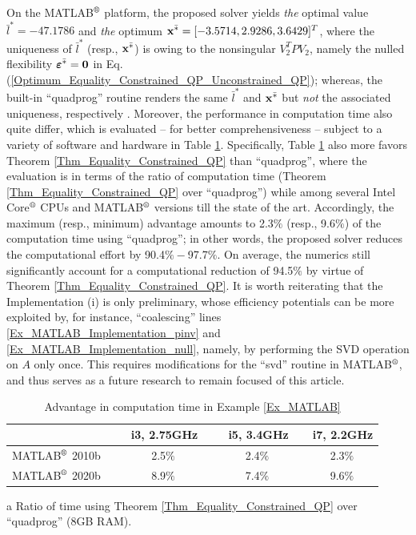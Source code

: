 \documentclass{imaman}
\newcommand{\bfx}{{\bf x}}
\newcommand{\bfvarepsilon}{{\boldsymbol \varepsilon}}
\newcommand{\bfzero}{{\bf 0}}
\numberwithin{equation}{section}
\begin{document}
\begin{example}
On the MATLAB$\textsuperscript{\textregistered}$ platform, the proposed solver yields \textit{the} optimal value $\bar l^*=-47.1786$ and \textit{the} optimum $\bfx^{\bar *}=[-3.5714,2.9286,3.6429]^T$, where the uniqueness of $\bar l^*$ (resp., $\bfx^{\bar *}$) is owing to the nonsingular $V_2^TPV_2$, namely the nulled flexibility $\bfvarepsilon^{\bar *}=\bfzero$ in Eq. (\ref{Optimum_Equality_Constrained_QP_Unconstrained_QP}); whereas, the built-in ``quadprog'' routine renders the same $\bar l^*$ and $\bfx^{\bar *}$ but \textit{not} the associated uniqueness, respectively \cite{MATLAB}. Moreover, the performance in computation time also quite differ, which is evaluated -- for better comprehensiveness -- subject to a variety of software and hardware in Table \ref{Table_Ex_MATLAB}. Specifically, Table \ref{Table_Ex_MATLAB} also more favors Theorem \ref{Thm_Equality_Constrained_QP} than ``quadprog'', where the evaluation is in terms of the ratio of computation time (Theorem \ref{Thm_Equality_Constrained_QP} over ``quadprog'') while among several Intel Core$\textsuperscript{\textregistered}$ CPUs and MATLAB$\textsuperscript{\textregistered}$ versions till the state of the art. Accordingly, the maximum (resp., minimum) advantage amounts to 2.3$\%$ (resp., 9.6$\%$) of the computation time using ``quadprog''; in other words, the proposed solver reduces the computational effort by 90.4$\%-$97.7$\%$. On average, the numerics still significantly account for a computational reduction of 94.5$\%$ by virtue of Theorem \ref{Thm_Equality_Constrained_QP}. It is worth reiterating that the Implementation (i) is only preliminary, whose efficiency potentials can be more exploited by, for instance, ``coalescing'' lines \ref{Ex_MATLAB_Implementation_pinv} and \ref{Ex_MATLAB_Implementation_null}, namely, by performing the SVD operation on $A$ only once. This requires modifications for the ``svd'' routine in MATLAB$\textsuperscript{\textregistered}$, and thus serves as a future research to remain focused of this article.

\begin{table}[htbp]
\centering
\begin{threeparttable}[htbp]
\caption{Advantage in computation time in Example {\rm\ref{Ex_MATLAB}}}
\renewcommand{\arraystretch}{1.5}
\begin{tabular}{l c c c}
\hline
 & ~~~i3, 2.75GHz & ~~~i5, 3.4GHz & ~~i7, 2.2GHz \\ \hline
MATLAB$\textsuperscript{\textregistered}$ 2010b & ~~~2.5$\%$ & ~~~2.4$\%$ & ~~2.3$\%$ \\
MATLAB$\textsuperscript{\textregistered}$ 2020b & ~~~8.9$\%$ & ~~~7.4$\%$ & ~~9.6$\%$ \\ \hline
\end{tabular}
\begin{tablenotes}
\item [a] Ratio of time using Theorem \ref{Thm_Equality_Constrained_QP} over ``quadprog'' (8GB RAM).
\end{tablenotes}
\label{Table_Ex_MATLAB}
\end{threeparttable}
\end{table}


\end{example}
\end{document}
